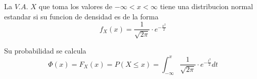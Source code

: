 
\begin{definition}
    La $V.A.$ $X$ que toma los valores de $-\infty < x < \infty$ tiene una distribucion normal estandar si su funcion de densidad es de la forma
    \begin{equation*}
        f_{X}(x) = \frac{1}{\sqrt{2\pi}} \cdot e^{-\frac{x^{2}}{2}}
    \end{equation*}
    \begin{center}
        
    \end{center}
    Su probabilidad se calcula
    \begin{equation*}
        \Phi(x) = F_{X}(x) = P(X \leq x) = \int_{-\infty}^{x} \frac{1}{\sqrt{2\pi}} \cdot e^{-\frac{t^{2}}{2}} dt
    \end{equation*}
\end{definition}